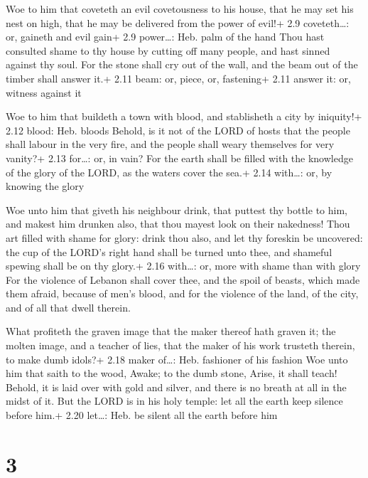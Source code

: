  Woe to him that coveteth an evil covetousness to his
house, that he may set his nest on high, that he may be delivered from
the power of evil!+ 2.9 coveteth\ldots: or, gaineth and evil gain+ 2.9
power\ldots: Heb. palm of the hand  Thou hast consulted
shame to thy house by cutting off many people, and hast sinned against
thy soul.  For the stone shall cry out of the wall, and the
beam out of the timber shall answer it.+ 2.11 beam: or, piece, or,
fastening+ 2.11 answer it: or, witness against it

 Woe to him that buildeth a town with blood, and
stablisheth a city by iniquity!+ 2.12 blood: Heb. bloods 
Behold, is it not of the LORD of hosts that the people shall labour in
the very fire, and the people shall weary themselves for very vanity?+
2.13 for\ldots: or, in vain?  For the earth shall be filled
with the knowledge of the glory of the LORD, as the waters cover the
sea.+ 2.14 with\ldots: or, by knowing the glory

 Woe unto him that giveth his neighbour drink, that
puttest thy bottle to him, and makest him drunken also, that thou mayest
look on their nakedness!  Thou art filled with shame for
glory: drink thou also, and let thy foreskin be uncovered: the cup of
the LORD's right hand shall be turned unto thee, and shameful spewing
shall be on thy glory.+ 2.16 with\ldots: or, more with shame than with
glory  For the violence of Lebanon shall cover thee, and
the spoil of beasts, which made them afraid, because of men's blood, and
for the violence of the land, of the city, and of all that dwell
therein.

 What profiteth the graven image that the maker thereof
hath graven it; the molten image, and a teacher of lies, that the maker
of his work trusteth therein, to make dumb idols?+ 2.18 maker of\ldots:
Heb. fashioner of his fashion  Woe unto him that saith to
the wood, Awake; to the dumb stone, Arise, it shall teach! Behold, it is
laid over with gold and silver, and there is no breath at all in the
midst of it.  But the LORD is in his holy temple: let all
the earth keep silence before him.+ 2.20 let\ldots: Heb. be silent all
the earth before him

\hypertarget{section-2}{%
\section{3}\label{section-2}}

